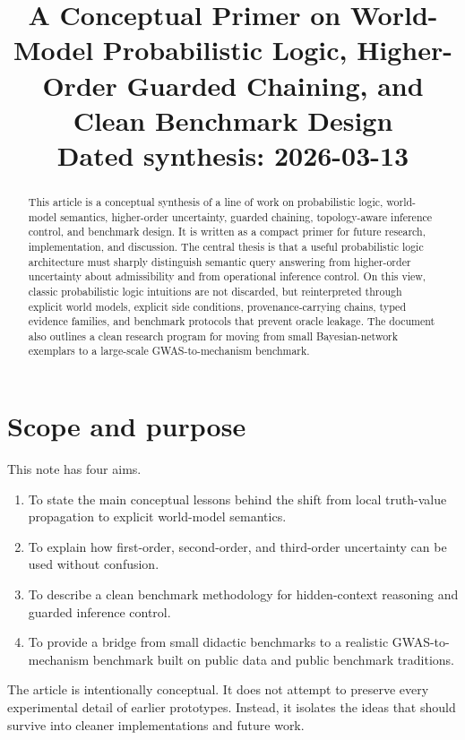 \documentclass[11pt]{article}
\title{A Conceptual Primer on World-Model Probabilistic Logic, Higher-Order Guarded Chaining, and Clean Benchmark Design\\\large Dated synthesis: 2026-03-13}
\author{}
\date{}
\begin{document}
\maketitle

\begin{abstract}
This article is a conceptual synthesis of a line of work on probabilistic logic, world-model semantics, higher-order uncertainty, guarded chaining, topology-aware inference control, and benchmark design. It is written as a compact primer for future research, implementation, and discussion. The central thesis is that a useful probabilistic logic architecture must sharply distinguish semantic query answering from higher-order uncertainty about admissibility and from operational inference control. On this view, classic probabilistic logic intuitions are not discarded, but reinterpreted through explicit world models, explicit side conditions, provenance-carrying chains, typed evidence families, and benchmark protocols that prevent oracle leakage. The document also outlines a clean research program for moving from small Bayesian-network exemplars to a large-scale GWAS-to-mechanism benchmark.\end{abstract}

\tableofcontents

\section{Scope and purpose}
This note has four aims.
\begin{enumerate}[label=\arabic*.]
    \item To state the main conceptual lessons behind the shift from local truth-value propagation to explicit world-model semantics.
    \item To explain how first-order, second-order, and third-order uncertainty can be used without confusion.
    \item To describe a clean benchmark methodology for hidden-context reasoning and guarded inference control.
    \item To provide a bridge from small didactic benchmarks to a realistic GWAS-to-mechanism benchmark built on public data and public benchmark traditions.
\end{enumerate}

The article is intentionally conceptual. It does not attempt to preserve every experimental detail of earlier prototypes. Instead, it isolates the ideas that should survive into cleaner implementations and future work.
\end{document}
